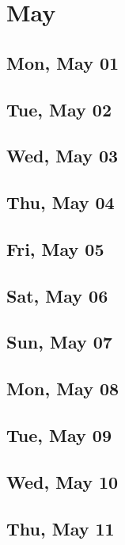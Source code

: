 \chapter{May}
	\section{Mon, May 01}
		
	\section{Tue, May 02}
		
	\section{Wed, May 03}
		
	\section{Thu, May 04}
		
	\section{Fri, May 05}
		
	\section{Sat, May 06}
		
	\section{Sun, May 07}
		
	\section{Mon, May 08}
		
	\section{Tue, May 09}
		
	\section{Wed, May 10}
		
	\section{Thu, May 11}
		
